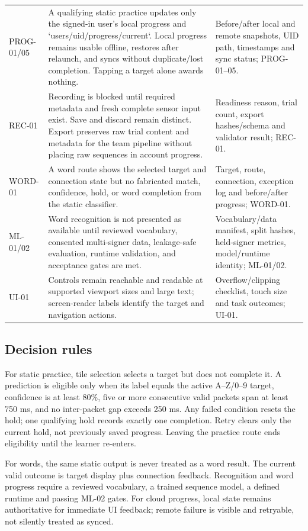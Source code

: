 \documentclass[10pt,letterpaper]{article}
\begin{document}
\begin{longtable}{@{}P{0.78in}P{3.27in}P{2.88in}@{}}
PROG-01/05 & A qualifying static practice updates only the signed-in user's local progress and `users/{uid}/progress/current`. Local progress remains usable offline, restores after relaunch, and syncs without duplicate/lost completion. Tapping a target alone awards nothing. & Before/after local and remote snapshots, UID path, timestamps and sync status; PROG-01--05. \\
REC-01 & Recording is blocked until required metadata and fresh complete sensor input exist. Save and discard remain distinct. Export preserves raw trial content and metadata for the team pipeline without placing raw sequences in account progress. & Readiness reason, trial count, export hashes/schema and validator result; REC-01. \\
WORD-01 & A word route shows the selected target and connection state but no fabricated match, confidence, hold, or word completion from the static classifier. & Target, route, connection, exception log and before/after progress; WORD-01. \\
ML-01/02 & Word recognition is not presented as available until reviewed vocabulary, consented multi-signer data, leakage-safe evaluation, runtime validation, and acceptance gates are met. & Vocabulary/data manifest, split hashes, held-signer metrics, model/runtime identity; ML-01/02. \\
UI-01 & Controls remain reachable and readable at supported viewport sizes and large text; screen-reader labels identify the target and navigation actions. & Overflow/clipping checklist, touch size and task outcomes; UI-01. \\
\end{longtable}\subsection{Decision rules}
For static practice, tile selection selects a target but does not complete it. A prediction is eligible only when its label equals the active A--Z/0--9 target, confidence is at least 80\%, five or more consecutive valid packets span at least 750 ms, and no inter-packet gap exceeds 250 ms. Any failed condition resets the hold; one qualifying hold records exactly one completion. Retry clears only the current hold, not previously saved progress. Leaving the practice route ends eligibility until the learner re-enters.

For words, the same static output is never treated as a word result. The current valid outcome is target display plus connection feedback. Recognition and word progress require a reviewed vocabulary, a trained sequence model, a defined runtime and passing ML-02 gates. For cloud progress, local state remains authoritative for immediate UI feedback; remote failure is visible and retryable, not silently treated as synced.
\end{document}

